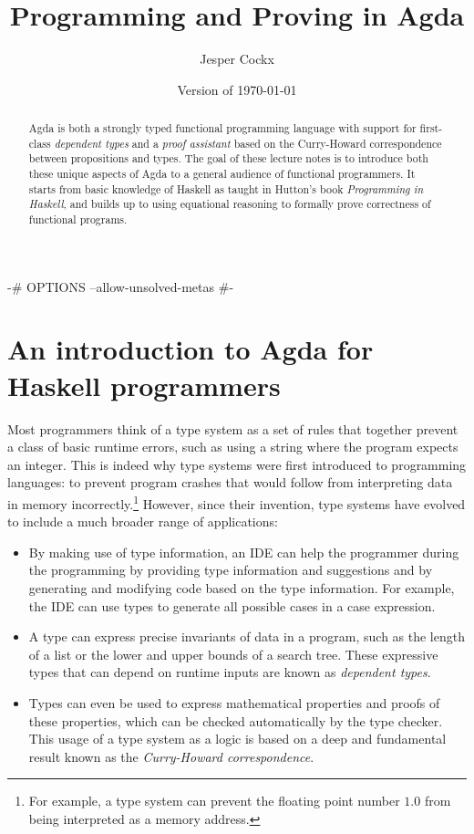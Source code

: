 \documentclass[a4paper,UKenglish]{tufte-handout}
\title{Programming and Proving in Agda}
\author{Jesper Cockx}
\date{Version of \today}
\theoremstyle{definition}
\begin{document}
\begin{code}[hide]
{-# OPTIONS --allow-unsolved-metas #-}
\end{code}

\maketitle

\begin{abstract}
Agda is both a strongly typed functional programming language with
support for first-class \emph{dependent types} and a \emph{proof
assistant} based on the Curry-Howard correspondence between
propositions and types. The goal of these lecture notes is to introduce both
these unique aspects of Agda to a general audience of functional
programmers. It starts from basic knowledge of Haskell as taught in
Hutton's book \emph{Programming in Haskell}, and builds up to
using equational reasoning to formally prove correctness of
functional programs.
\end{abstract}

\tableofcontents
\clearpage

\section{An introduction to Agda for Haskell programmers}

Most programmers think of a type system as a set of rules that
together prevent a class of basic runtime errors, such as using a
string where the program expects an integer. This is indeed why type
systems were first introduced to programming languages: to prevent
program crashes that would follow from interpreting data in memory
incorrectly.\footnote{For example, a type system can prevent the
floating point number $1.0$ from being interpreted as a memory
address.}  However, since their invention, type systems have evolved
to include a much broader range of applications:

\begin{itemize}

\item By making use of type information, an IDE can help the
programmer during the programming by providing type information and
suggestions and by generating and modifying code based on the type
information. For example, the IDE can use types to generate all
possible cases in a case expression.

\item A type can express precise invariants of data in a program, such
as the length of a list or the lower and upper bounds of a search
tree. These expressive types that can depend on runtime inputs are
known as \emph{dependent types}.

\item Types can even be used to express mathematical properties and
proofs of these properties, which can be checked automatically by the
type checker. This usage of a type system as a logic is based on a
deep and fundamental result known as the \emph{Curry-Howard
correspondence}.

\end{itemize}
\end{document}
